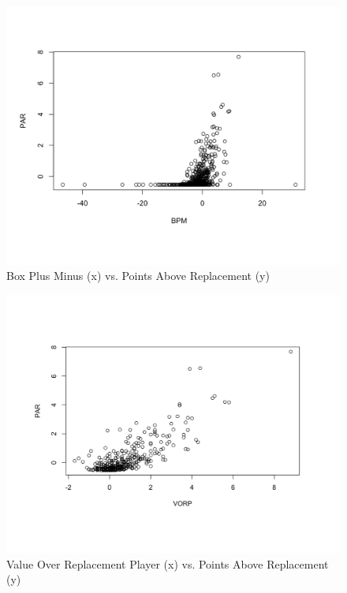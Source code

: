 \documentclass[12pt]{article}
\begin{document}
\begin{figure}[H]
  \centering
  \includegraphics[width=\textwidth]{BPMvsPAR}
  \caption{Box Plus Minus (x) vs. Points Above Replacement (y)}
  \label{fig:Fig3}
\end{figure}

\begin{figure}[H]
  \centering
  \includegraphics[width=\textwidth]{VORPvsPAR}
  \caption{Value Over Replacement Player (x) vs. Points Above Replacement (y)}
  \label{fig:Fig4}
\end{figure}
\end{document}
